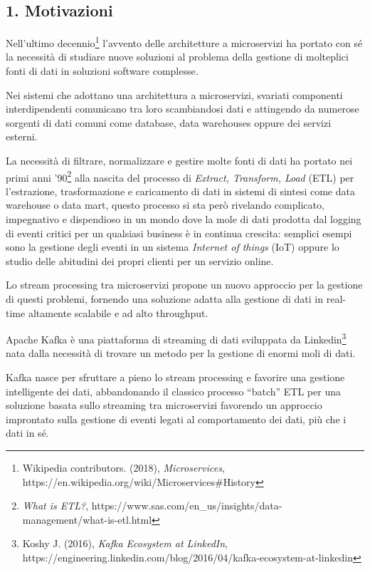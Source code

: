 \documentclass[]{article}
\begin{document}
\newpage

\hypertarget{motivazioni}{\subsection{1.
Motivazioni}\label{motivazioni}}

Nell'ultimo decennio\footnote{Wikipedia contributors. (2018),
  \emph{Microservices},
  https://en.wikipedia.org/wiki/Microservices\#History} l'avvento delle
architetture a microservizi ha portato con sé la necessità di studiare
nuove soluzioni al problema della gestione di molteplici fonti di dati
in soluzioni software complesse.

Nei sistemi che adottano una architettura a microservizi, svariati
componenti interdipendenti comunicano tra loro scambiandosi dati e
attingendo da numerose sorgenti di dati comuni come database, data
warehouses oppure dei servizi esterni.

La necessità di filtrare, normalizzare e gestire molte fonti di dati ha
portato nei primi anni '90\footnote{\emph{What is ETL?},
  https://www.sas.com/en\_us/insights/data-management/what-is-etl.html}
alla nascita del processo di \emph{Extract, Transform, Load} (ETL) per
l'estrazione, trasformazione e caricamento di dati in sistemi di sintesi
come data warehouse o data mart, questo processo si sta però rivelando
complicato, impegnativo e dispendioso in un mondo dove la mole di dati
prodotta dal logging di eventi critici per un qualsiasi business è in
continua crescita: semplici esempi sono la gestione degli eventi in un
sistema \emph{Internet of things} (IoT) oppure lo studio delle abitudini
dei propri clienti per un servizio online.

Lo stream processing tra microservizi propone un nuovo approccio per la
gestione di questi problemi, fornendo una soluzione adatta alla gestione
di dati in real-time altamente scalabile e ad alto throughput.

Apache Kafka è una piattaforma di streaming di dati sviluppata da
Linkedin\footnote{Koshy J. (2016), \emph{Kafka Ecosystem at LinkedIn},
  https://engineering.linkedin.com/blog/2016/04/kafka-ecosystem-at-linkedin}
nata dalla necessità di trovare un metodo per la gestione di enormi moli
di dati.

Kafka nasce per sfruttare a pieno lo stream processing e favorire una
gestione intelligente dei dati, abbandonando il classico processo
``batch'' ETL per una soluzione basata sullo streaming tra microservizi
favorendo un approccio improntato sulla gestione di eventi legati al
comportamento dei dati, più che i dati in sé.
\end{document}
